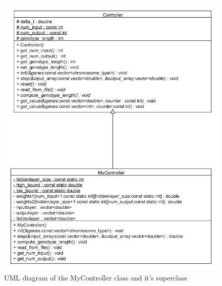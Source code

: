 \begin{figure}[h]
\centering
\includegraphics[scale=0.6]{Chapter2/images/controlle_uml.png}
\caption{UML diagram of the MyController class and it's superclass}
\label{fig:controller_uml}
\end{figure}

